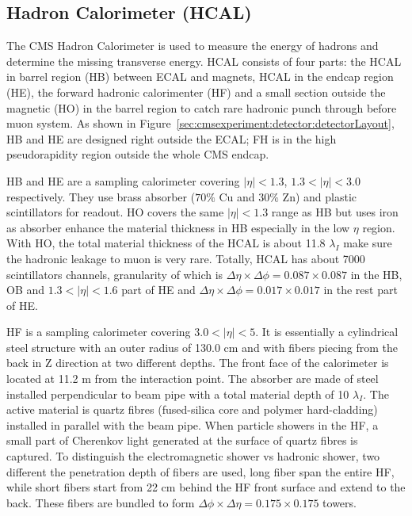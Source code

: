 \subsection{Hadron Calorimeter (HCAL)}
The CMS Hadron Calorimeter \cite{cms:hcalTdrCMS:1997xji} is used to measure the energy of hadrons and determine the missing transverse energy. HCAL consists of four parts: the HCAL in barrel region (HB) between ECAL and magnets, HCAL in the endcap region (HE), the forward hadronic calorimenter (HF) and a small section outside the magnetic (HO) in the barrel region to catch rare hadronic punch through before muon system. As shown in Figure~\ref{sec:cmsexperiment:detector:detectorLayout}, HB and HE are designed right outside the ECAL; FH is in the high pseudorapidity region outside the whole CMS endcap.

HB and HE are a sampling calorimeter covering $|\eta|< 1.3$, $1.3<|\eta|< 3.0$ respectively. They use brass absorber ($70\%$ Cu and $30\%$ Zn) and plastic scintillators for readout. HO covers the same $|\eta|< 1.3$ range as HB but uses iron as absorber enhance the material thickness in HB especially in the low $\eta$ region. With HO, the total material thickness of the HCAL is about 11.8 $\lambda_I$ make sure the hadronic leakage to muon is very rare. Totally, HCAL has about 7000 scintillators channels, granularity of which is $\Delta \eta \times \Delta \phi = 0.087 \times 0.087$ in the HB, OB and $1.3<|\eta|< 1.6$ part of HE and $\Delta \eta \times \Delta \phi = 0.017 \times 0.017$ in the rest part of HE.

HF is a sampling calorimeter covering $3.0 < |\eta| < 5$. It is essentially a cylindrical steel structure with an outer radius of 130.0 cm and with fibers piecing from the back in Z direction at two different depths. The front face of the calorimeter is located at 11.2 m from the interaction point. The absorber are made of steel installed perpendicular to beam pipe with a total material depth of 10 $\lambda_I$. The active material is quartz fibres (fused-silica core and polymer hard-cladding) installed in parallel with the beam pipe. When particle showers in the HF, a small part of Cherenkov light generated at the surface of quartz fibres is captured. To distinguish the electromagnetic shower vs hadronic shower, two different the penetration depth of fibers are used, long fiber span the entire HF, while short fibers start from 22 cm behind the HF front surface and extend to the back. These fibers are bundled to form $\Delta \phi \times \Delta \eta = 0.175 \times 0.175$ towers. 


